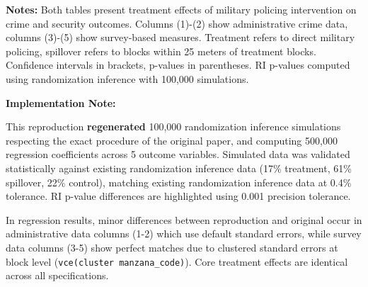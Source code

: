 \documentclass[11pt]{article}
\begin{document}
\vspace{1em}

\noindent \textbf{Notes:} Both tables present treatment effects of military policing intervention on crime and security outcomes. Columns (1)-(2) show administrative crime data, columns (3)-(5) show survey-based measures. Treatment refers to direct military policing, spillover refers to blocks within 25 meters of treatment blocks. Confidence intervals in brackets, p-values in parentheses. RI p-values computed using randomization inference with 100,000 simulations.

\vspace{0.5em}

\noindent \textbf{Implementation Note:} 
\par This reproduction \textbf{regenerated} 100,000 randomization inference simulations respecting the exact procedure of the original paper,  and computing 500,000 regression coefficients across 5 outcome variables. Simulated data was validated statistically against existing randomization inference data (17\% treatment, 61\% spillover, 22\% control), matching existing randomization inference data at 0.4\% tolerance. RI p-value differences are highlighted using 0.001 precision tolerance. 
\par In regression results, minor differences between reproduction and original occur in administrative data columns (1-2) which use default standard errors, while survey data columns (3-5) show perfect matches due to clustered standard errors at block level (\texttt{vce(cluster manzana\_code)}). Core treatment effects are identical across all specifications.
\end{document}
